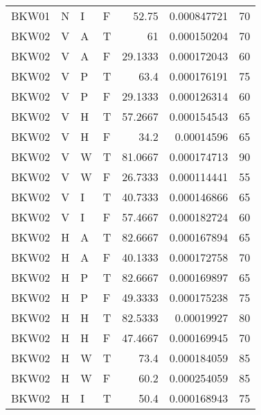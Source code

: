 \begin{longtable}{llllrrr}
    BKW01    & N         & I         & F          & 52.75      & 0.000847721 & 70       \\
    BKW02    & V         & A         & T          & 61         & 0.000150204 & 70       \\
    BKW02    & V         & A         & F          & 29.1333    & 0.000172043 & 60       \\
    BKW02    & V         & P         & T          & 63.4       & 0.000176191 & 75       \\
    BKW02    & V         & P         & F          & 29.1333    & 0.000126314 & 60       \\
    BKW02    & V         & H         & T          & 57.2667    & 0.000154543 & 65       \\
    BKW02    & V         & H         & F          & 34.2       & 0.00014596  & 65       \\
    BKW02    & V         & W         & T          & 81.0667    & 0.000174713 & 90       \\
    BKW02    & V         & W         & F          & 26.7333    & 0.000114441 & 55       \\
    BKW02    & V         & I         & T          & 40.7333    & 0.000146866 & 65       \\
    BKW02    & V         & I         & F          & 57.4667    & 0.000182724 & 60       \\
    BKW02    & H         & A         & T          & 82.6667    & 0.000167894 & 65       \\
    BKW02    & H         & A         & F          & 40.1333    & 0.000172758 & 70       \\
    BKW02    & H         & P         & T          & 82.6667    & 0.000169897 & 65       \\
    BKW02    & H         & P         & F          & 49.3333    & 0.000175238 & 75       \\
    BKW02    & H         & H         & T          & 82.5333    & 0.00019927  & 80       \\
    BKW02    & H         & H         & F          & 47.4667    & 0.000169945 & 70       \\
    BKW02    & H         & W         & T          & 73.4       & 0.000184059 & 85       \\
    BKW02    & H         & W         & F          & 60.2       & 0.000254059 & 85       \\
    BKW02    & H         & I         & T          & 50.4       & 0.000168943 & 75       \\

\end{longtable}
